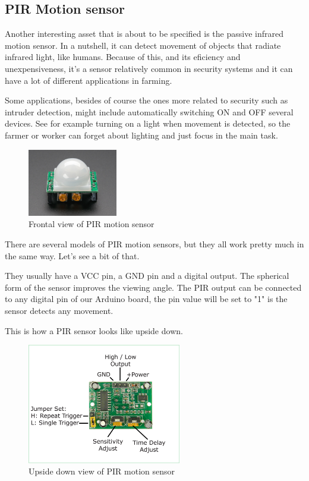 \subsection{PIR Motion sensor}
Another interesting asset that is about to be specified is the passive infrared motion sensor\cite{pir-guide}. In a nutshell, it can detect movement of objects that radiate infrared light, like humans. Because of this, and its eficiency and unexpensiveness, it's a sensor relatively common in security systems and it can have a lot of different applications in farming.

Some applications, besides of course the ones more related to security such as intruder detection, might include automatically switching ON and OFF several devices. See for example turning on a light when movement is detected, so the farmer or worker can forget about lighting and just focus in the main task.

\begin{figure}[H]
    \centering
    \includegraphics[width=0.35\textwidth]{fig/pir.jpg}
    \caption{Frontal view of PIR motion sensor}
    \label{fig:pir}
\end{figure}


There are several models of PIR motion sensors, but they all work pretty much in the same way. Let's see a bit of that.

They usually have a VCC pin, a GND pin and a digital output. The spherical form of the sensor improves the viewing angle. The PIR output can be connected to any digital pin of our Arduino board, the pin value will be set to "1" is the sensor detects any movement.

This is how a PIR sensor looks like upside down.

\begin{figure}[H]
    \centering
    \includegraphics[width=0.6\textwidth]{fig/pir-upside-down.png}
    \caption{Upside down view of PIR motion sensor}
    \label{fig:pir-upsidedown}
\end{figure}

